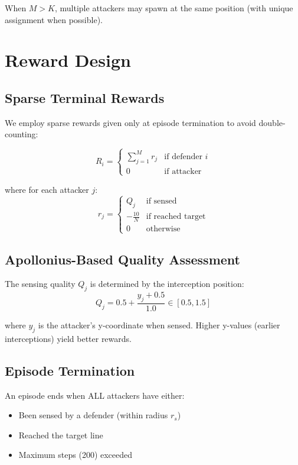 \documentclass[11pt,a4paper]{article}
\begin{document}
When $M > K$, multiple attackers may spawn at the same position (with unique assignment when possible).

\section{Reward Design}

\subsection{Sparse Terminal Rewards}

We employ sparse rewards given only at episode termination to avoid double-counting:

\begin{equation}
    R_i = \begin{cases}
        \sum_{j=1}^{M} r_j & \text{if defender } i \\
        0 & \text{if attacker}
    \end{cases}
\end{equation}

where for each attacker $j$:
\begin{equation}
    r_j = \begin{cases}
        Q_j & \text{if sensed} \\
        -\frac{10}{N} & \text{if reached target} \\
        0 & \text{otherwise}
    \end{cases}
\end{equation}

\subsection{Apollonius-Based Quality Assessment}

The sensing quality $Q_j$ is determined by the interception position:
\begin{equation}
    Q_j = 0.5 + \frac{y_j + 0.5}{1.0} \in [0.5, 1.5]
\end{equation}

where $y_j$ is the attacker's y-coordinate when sensed. Higher y-values (earlier interceptions) yield better rewards.

\subsection{Episode Termination}

An episode ends when ALL attackers have either:
\begin{itemize}
    \item Been sensed by a defender (within radius $r_s$)
    \item Reached the target line
    \item Maximum steps (200) exceeded
\end{itemize}
\end{document}
